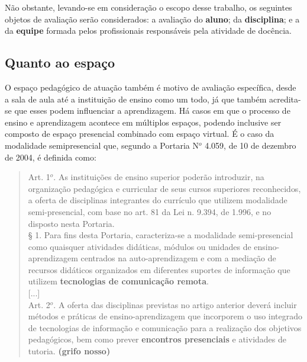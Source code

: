 Não obstante, levando-se em consideração o escopo desse trabalho, os seguintes objetos de avaliação serão considerados: a avaliação do \textbf{aluno}; da \textbf{disciplina}; e a da \textbf{equipe} formada pelos profissionais responsáveis pela atividade de docência.

\subsection{Quanto ao espaço}%

O espaço pedagógico de atuação também é motivo de avaliação específica, desde a sala de aula até a instituição de ensino como um todo, já que também acredita-se que esses podem influenciar a aprendizagem. Há casos em que o processo de ensino e aprendizagem acontece em múltiplos espaços, podendo inclusive ser composto de espaço presencial combinado com espaço virtual. É o caso da modalidade semipresencial que, segundo a Portaria N{$^o$} 4.059, de 10 de dezembro de 2004, é definida como:

\begin{quote}
Art. 1{$^o$}. As instituições de ensino superior poderão introduzir, na organização
pedagógica e curricular de seus cursos superiores reconhecidos, a oferta de disciplinas
integrantes do currículo que utilizem modalidade semi-presencial, com base no art. 81
da Lei n. 9.394, de 1.996, e no disposto nesta Portaria.  \\
§ 1. Para fins desta Portaria, caracteriza-se a modalidade semi-presencial como quaisquer atividades didáticas, módulos ou unidades de ensino-aprendizagem centrados na auto-aprendizagem e com a mediação de recursos didáticos organizados em diferentes suportes de informação que utilizem \textbf{tecnologias de comunicação remota}. \\
{[...]}  \\
Art. 2{$^o$}. A oferta das disciplinas previstas no artigo anterior deverá incluir métodos e práticas de ensino-aprendizagem que incorporem o uso integrado de tecnologias de informação e comunicação para a realização dos objetivos pedagógicos, bem como prever \textbf{encontros presenciais} e atividades de tutoria. \textbf{(grifo nosso)}~\cite{brasilMEC}
\end{quote}%



